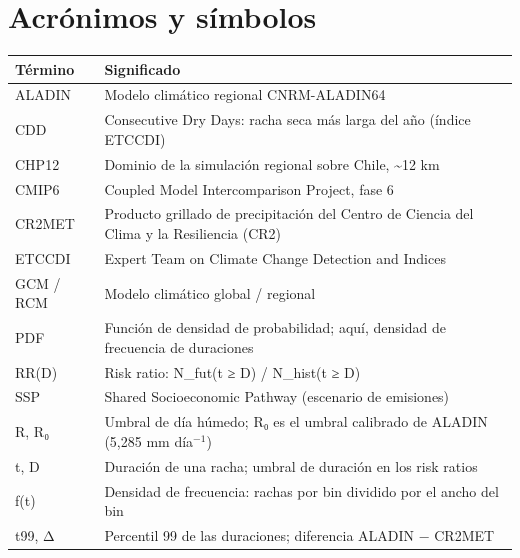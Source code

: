\chapter*{Acrónimos y símbolos}
{\def\LTcaptype{none} %
\begin{longtable}[]{@{}
  >{\raggedright\arraybackslash}p{}
  >{\raggedright\arraybackslash}p{}@{}}
\toprule\noalign{}
\begin{minipage}[b]{\linewidth}\raggedright
Término
\end{minipage} & \begin{minipage}[b]{\linewidth}\raggedright
Significado
\end{minipage} \\
\midrule\noalign{}
\endhead
\bottomrule\noalign{}
\endlastfoot
ALADIN & Modelo climático regional CNRM-ALADIN64 \\
CDD & Consecutive Dry Days: racha seca más larga del año (índice ETCCDI) \\
CHP12 & Dominio de la simulación regional sobre Chile, \textasciitilde12 km \\
CMIP6 & Coupled Model Intercomparison Project, fase 6 \\
CR2MET & Producto grillado de precipitación del Centro de Ciencia del Clima y la Resiliencia (CR2) \\
ETCCDI & Expert Team on Climate Change Detection and Indices \\
GCM / RCM & Modelo climático global / regional \\
PDF & Función de densidad de probabilidad; aquí, densidad de frecuencia de duraciones \\
RR(D) & Risk ratio: N\_fut(t ≥ D) / N\_hist(t ≥ D) \\
SSP & Shared Socioeconomic Pathway (escenario de emisiones) \\
R, R₀ & Umbral de día húmedo; R₀ es el umbral calibrado de ALADIN (5,285 mm día$^{-1}$) \\
t, D & Duración de una racha; umbral de duración en los risk ratios \\
f(t) & Densidad de frecuencia: rachas por bin dividido por el ancho del bin \\
t99, Δ & Percentil 99 de las duraciones; diferencia ALADIN − CR2MET \\
\end{longtable}
}

